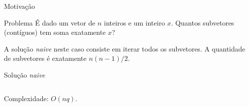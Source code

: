 \begin{frame}{Motivação}

    \begin{block}{Problema}
        É dado um vetor de $n$ inteiros e um inteiro $x$. Quantos subvetores (contíguos) tem soma exatamente $x$?
    \end{block} \pause

    A solução \textit{naive} neste caso consiste em iterar todos os subvetores. A quantidade de subvetores é exatamente $n(n-1)/2$. 

    \begin{block}{Solução \textit{naive}}
        \footnotesize
        \inputminted{cpp}{codigos/naive2.cpp}    
    \end{block}

    
    Complexidade: \pause $O(nq)$.
\end{frame}

